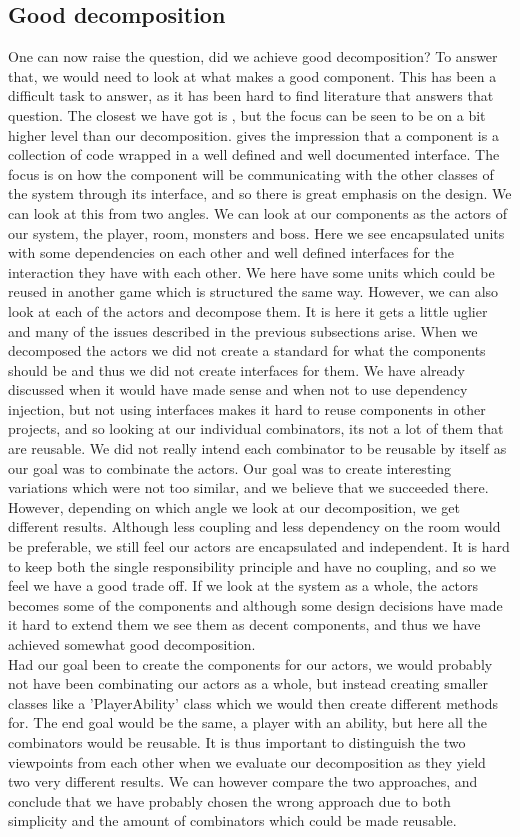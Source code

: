 \subsection{Good decomposition}
One can now raise the question, did we achieve good decomposition? To answer that, we would need to look at what makes a good component. This has been a difficult task to answer, as it has been hard to find literature that answers that question. The closest we have got is \cite{Components}, but the focus can be seen to be on a bit higher level than our decomposition. \cite{Components} gives the impression that a component is a collection of code wrapped in a well defined and well documented interface. The focus is on how the component will be communicating with the other classes of the system through its interface, and so there is great emphasis on the design. We can look at this from two angles. We can look at our components as the actors of our system, the player, room, monsters and boss. Here we see encapsulated units with some dependencies on each other and well defined interfaces for the interaction they have with each other. We here have some units which could be reused in another game which is structured the same way. However, we can also look at each of the actors and decompose them. It is here it gets a little uglier and many of the issues described in the previous subsections arise. When we decomposed the actors we did not create a standard for what the components should be and thus we did not create interfaces for them. We have already discussed when it would have made sense and when not to use dependency injection, but not using interfaces makes it hard to reuse components in other projects, and so looking at our individual combinators, its not a lot of them that are reusable. We did not really intend each combinator to be reusable by itself as our goal was to combinate the actors. Our goal was to create interesting variations which were not too similar, and we believe that we succeeded there. However, depending on which angle we look at our decomposition, we get different results. Although less coupling and less dependency on the room would be preferable, we still feel our actors are encapsulated and independent. It is hard to keep both the single responsibility principle and have no coupling, and so we feel we have a good trade off. If we look at the system as a whole, the actors becomes some of the components and although some design decisions have made it hard to extend them we see them as decent components, and thus we have achieved somewhat good decomposition.\\
Had our goal been to create the components for our actors, we would probably not have been combinating our actors as a whole, but instead creating smaller classes like a 'PlayerAbility' class which we would then create different methods for. The end goal would be the same, a player with an ability, but here all the combinators would be reusable. It is thus important to distinguish the two viewpoints from each other when we evaluate our decomposition as they yield two very different results. We can however compare the two approaches, and conclude that we have probably chosen the wrong approach due to both simplicity and the amount of combinators which could be made reusable. 
